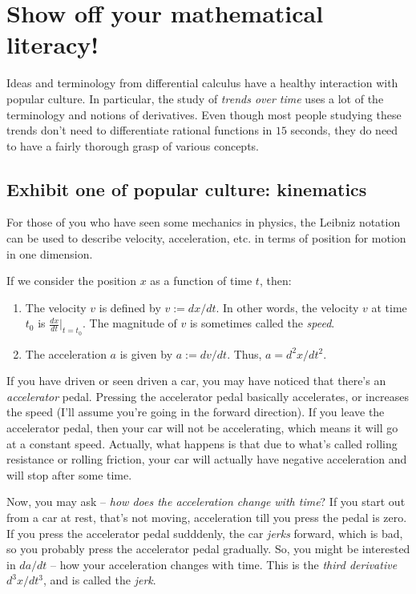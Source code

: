 \section{Show off your mathematical literacy!}

Ideas and terminology from differential calculus have a healthy
interaction with popular culture. In particular, the study of {\em
trends over time} uses a lot of the terminology and notions of
derivatives. Even though most people studying these trends don't need
to differentiate rational functions in $15$ seconds, they do need to
have a fairly thorough grasp of various concepts.

\subsection{Exhibit one of popular culture: kinematics}

For those of you who have seen some mechanics in physics, the Leibniz
notation can be used to describe velocity, acceleration, etc. in terms
of position for motion in one dimension.

If we consider the position $x$ as a function of time $t$, then:

\begin{enumerate}
\item The velocity $v$ is defined by $v := dx/dt$. In other words, the
  velocity $v$ at time $t_0$ is $\frac{dx}{dt}|_{t = t_0}$. The
  magnitude of $v$ is sometimes called the {\em speed}.
\item The acceleration $a$ is given by $a := dv/dt$. Thus, $a =
  d^2x/dt^2$.
\end{enumerate}

If you have driven or seen driven a car, you may have noticed that
there's an {\em accelerator} pedal. Pressing the accelerator pedal
basically accelerates, or increases the speed (I'll assume you're
going in the forward direction). If you leave the accelerator pedal,
then your car will not be accelerating, which means it will go at a
constant speed. Actually, what happens is that due to what's called
rolling resistance or rolling friction, your car will actually have
negative acceleration and will stop after some time.

Now, you may ask -- {\em how does the acceleration change with time}?
If you start out from a car at rest, that's not moving, acceleration
till you press the pedal is zero. If you press the accelerator pedal
sudddenly, the car {\em jerks} forward, which is bad, so you probably
press the accelerator pedal gradually. So, you might be interested in
$da/dt$ -- how your acceleration changes with time. This is the {\em
third derivative} $d^3x/dt^3$, and is called the {\em jerk}.

